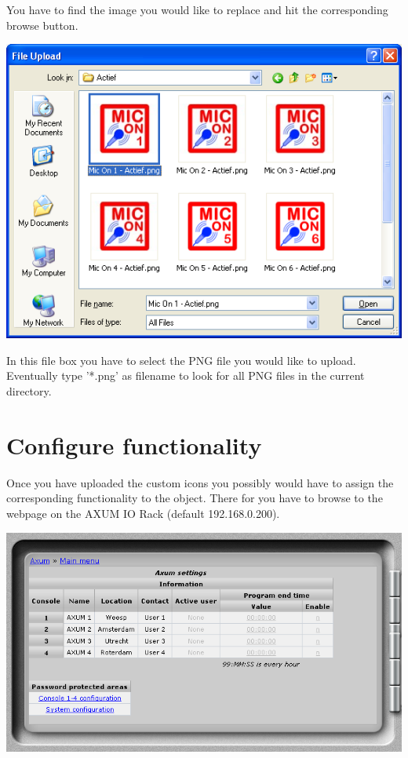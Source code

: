 \vspace{5mm}

You have to find the image you would like to replace and hit the corresponding browse button.

\vspace{5mm}

\pagebreak

\includegraphics[width=13.5cm]{browseimage.png}

In this file box you have to select the PNG file you would like to upload. Eventually type '*.png' as filename to look for all PNG files in the current directory.

\pagebreak

\section{Configure functionality}
Once you have uploaded the custom icons you possibly would have to assign the corresponding functionality to the object. There for you have to browse to the webpage on the AXUM IO Rack (default 192.168.0.200).

\vspace{5mm}

\includegraphics[width=13.5cm]{rackmainmenu.png}

